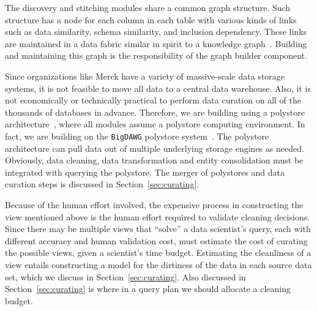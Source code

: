 The discovery and stitching modules share a common graph structure. Such structure has a node for each column in each table with various kinds of links such as data similarity, schema similarity, and inclusion dependency.  These links are maintained in a data fabric similar in spirit to a knowledge graph~\cite{DBLP:conf/semweb/AuerBKLCI07,DBLP:conf/sigmod/BollackerEPST08,DBLP:conf/www/SuchanekKW07}. Building and maintaining this graph is the responsibility of the graph builder component.


 Since organizations like Merck have a variety of massive-scale data storage systems, it is not feasible to move all data to a central data warehouse. Also, it is not economically or technically practical to perform data curation on all of the thousands of databases in advance.  Therefore, we are building \dcv using a polystore architecture~\cite{DBLP:journals/sigmod/DugganESBHKMMMZ15}, where all modules assume a polystore computing environment. In fact, we are building on the \texttt{BigDAWG} polystore system~\cite{DBLP:journals/pvldb/ElmoreDSBCGHHKK15}. The polystore architecture can pull data out of multiple underlying storage engines as needed. Obviously, data cleaning, data transformation and entity consolidation must be integrated with querying the polystore.  The merger of polystores and data curation steps is discussed in Section~\ref{sec:curating}.



 Because of the human effort involved, the expensive process in constructing the view mentioned above is the human effort required to validate cleaning decisions. Since there may be multiple views that ``solve'' a data scientist's query, each with different accuracy and human validation cost, \dcv must estimate the cost of curating the possible views,
given a scientist's time budget. Estimating the cleanliness of a view entails constructing a model for the dirtiness of the data in each source data set, which we discuss in Section~\ref{sec:curating}. Also discussed in Section~\ref{sec:curating} is where in a query plan we should allocate a cleaning budget.



